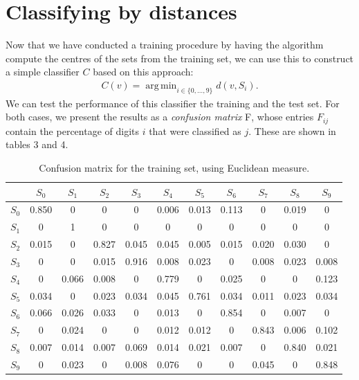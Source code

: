 \documentclass[11pt]{article}
\DeclareMathOperator*{\argmin}{arg\,min}
\begin{document}
\section{Classifying by distances}
Now that we have conducted a training procedure by having the algorithm compute the centres of the sets from the training set, we can use this to construct a simple classifier $C$ based on this approach:
\begin{align}
C(v)=\argmin_{i\in\{0,\ldots,9\}}d(v, S_i).
\end{align}
We can test the performance of this classifier the training and the test set. For both cases, we present the results as a \textit{confusion matrix} F, whose entries $F_{ij}$ contain the percentage of digits $i$ that were classified as $j$. These are shown in tables 3 and 4.
\begin{table}[!t]
\centering
\small
\begin{tabular}{c|cccccccccc}
&$S_0$&$S_1$&$S_2$&$S_3$&$S_4$&$S_5$&$S_6$&$S_7$&$S_8$&$S_9$\\\hline
$S_0$&0.850&0&0&0&0.006&0.013&0.113&0&0.019&0\\
$S_1$&0&1&0&0&0&0&0&0&0&0\\
$S_2$&0.015&0&0.827&0.045&0.045&0.005&0.015&0.020&0.030&0\\
$S_3$&0&0&0.015&0.916&0.008&0.023&0&0.008&0.023&0.008\\
$S_4$&0&0.066&0.008&0&0.779&0&0.025&0&0&0.123\\
$S_5$&0.034&0&0.023&0.034&0.045&0.761&0.034&0.011&0.023&0.034\\
$S_6$&0.066&0.026&0.033&0&0.013&0&0.854&0&0.007&0\\
$S_7$&0&0.024&0&0&0.012&0.012&0&0.843&0.006&0.102\\
$S_8$&0.007&0.014&0.007&0.069&0.014&0.021&0.007&0&0.840&0.021\\
$S_9$&0&0.023&0&0.008&0.076&0&0&0.045&0&0.848
\end{tabular}
\caption{Confusion matrix for the training set, using Euclidean measure.}
\normalsize
\end{table}
\end{document}
